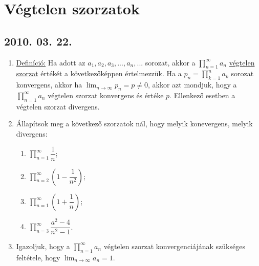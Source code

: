 \documentclass{article}
\newenvironment{abc}{\begin{enumerate}[label=\textit{\alph*})]}{\end{enumerate}}
\begin{document}
\section*{Végtelen szorzatok}

\subsection*{2010. 03. 22.}
\begin{enumerate}
\item \underline{Definíció:} Ha adott az $a_1, a_2, a_3,...,a_n,...$ sorozat, akkor a $\displaystyle\prod_{n=1}^{\infty} a_n$ \underline{végtelen szorzat} értékét a következőképpen értelmezzük. Ha a $p_n=\displaystyle\prod_{k=1}^{n} a_k$ sorozat konvergens, akkor ha $\displaystyle\lim_{n \to \infty}p_n=p\not=0$, akkor azt mondjuk, hogy a $\displaystyle\prod_{n=1}^{\infty} a_n$ végtelen szorzat konvergens és értéke $p$. Ellenkező esetben a végtelen szorzat divergens.
\item Állapítsok meg a következő szorzatok nál, hogy melyik konevergens, melyik divergens:
	\begin{abc}
	\item $\displaystyle\prod_{n=1}^{\infty} \dfrac{1}{n}$;
    \item $\displaystyle\prod_{n=2}^{\infty} \left(1-\dfrac{1}{n^2}\right)$;
    \item $\displaystyle\prod_{n=1}^{\infty} \left(1+\dfrac{1}{n}\right)$;
    \item $\displaystyle\prod_{n=3}^{\infty} \dfrac{a^2-4}{n^2-1}$.
	\end{abc}
\item Igazoljuk, hogy a $\displaystyle\prod_{n=1}^{\infty} a_n$ végtelen szorzat konvergenciájának szükséges feltétele, hogy $\displaystyle\lim_{n \to \infty}a_n=1$.

\end{enumerate}
\end{document}
